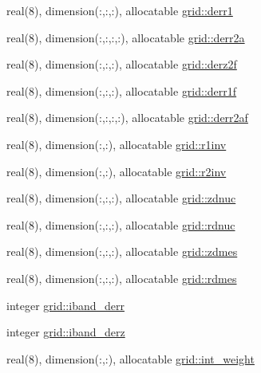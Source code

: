 \begin{DoxyCompactItemize}
\item 
real(8), dimension(\+:,\+:,\+:), allocatable \hyperlink{namespacegrid_a927d3ab579693ac5d3d1b383fc47309e}{grid\+::derr1}
\item 
real(8), dimension(\+:,\+:,\+:,\+:), allocatable \hyperlink{namespacegrid_a3d6fc00aedb6c70b6a7028425fcf06b6}{grid\+::derr2a}
\item 
real(8), dimension(\+:,\+:,\+:), allocatable \hyperlink{namespacegrid_a5a54381288367b46b4e714d245b33573}{grid\+::derz2f}
\item 
real(8), dimension(\+:,\+:,\+:), allocatable \hyperlink{namespacegrid_a0039357c12385ef014b08446e7cc0e6c}{grid\+::derr1f}
\item 
real(8), dimension(\+:,\+:,\+:,\+:), allocatable \hyperlink{namespacegrid_a8804ec2dcbfca2354a910b528fcd10d0}{grid\+::derr2af}
\item 
real(8), dimension(\+:,\+:), allocatable \hyperlink{namespacegrid_a37bbb6d76b285961dc17e687364ba48d}{grid\+::r1inv}
\item 
real(8), dimension(\+:,\+:), allocatable \hyperlink{namespacegrid_ac5d461ae0b4027338462085f7b2c117d}{grid\+::r2inv}
\item 
real(8), dimension(\+:,\+:,\+:), allocatable \hyperlink{namespacegrid_af4a35d1cb4ef0d6a9e9eac420a4e9638}{grid\+::zdnuc}
\item 
real(8), dimension(\+:,\+:,\+:), allocatable \hyperlink{namespacegrid_ab4cf4ad8b469e501cd06fbe82300f2ee}{grid\+::rdnuc}
\item 
real(8), dimension(\+:,\+:,\+:), allocatable \hyperlink{namespacegrid_af1ff89ca0b7f52aa01202240df562a10}{grid\+::zdmes}
\item 
real(8), dimension(\+:,\+:,\+:), allocatable \hyperlink{namespacegrid_a19320a5e6ed33bc3a07ef487bda6acff}{grid\+::rdmes}
\item 
integer \hyperlink{namespacegrid_a44dd95d936820f4f1b37d0a1eb780862}{grid\+::iband\+\_\+derr}
\item 
integer \hyperlink{namespacegrid_aa4819c3f9b94d2f272ae40641aedb49e}{grid\+::iband\+\_\+derz}
\item 
real(8), dimension(\+:,\+:), allocatable \hyperlink{namespacegrid_a77471665506f557a1b28abdc12d6a60a}{grid\+::int\+\_\+weight}
\end{DoxyCompactItemize}
